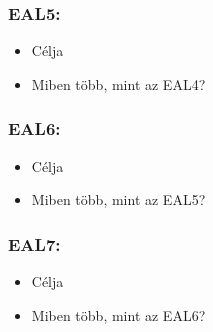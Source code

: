 \subsubsection{EAL5:}
\begin{itemize}
    \item{Célja}
    \item{Miben több, mint az EAL4?}
\end{itemize}
\subsubsection{EAL6:}
\begin{itemize}
    \item{Célja}
    \item{Miben több, mint az EAL5?}
\end{itemize}
\subsubsection{EAL7:}
\begin{itemize}
    \item{Célja}
    \item{Miben több, mint az EAL6?}
\end{itemize}
